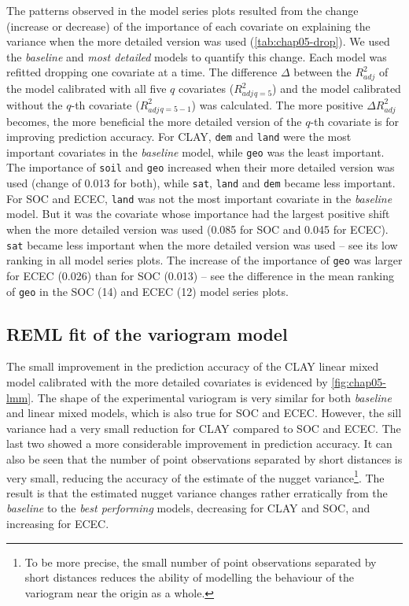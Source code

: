 The patterns observed in the model series plots resulted from the change (increase or decrease) of the 
importance of each covariate on explaining the variance when the more detailed version was used 
(\autoref{tab:chap05-drop}). We used the \emph{baseline} and \emph{most detailed} models to quantify this 
change. Each model was refitted dropping one covariate at a time. The difference $\Delta$ between the 
${R}^{2}_{adj}$ of the model calibrated with all five $q$ covariates (${R}^{2}_{adj}{}_{q = 5}$) and the model 
calibrated without the $q$-th covariate ($R^{2}_{adj}{}_{q = 5 - 1}$) was calculated. The more positive 
$\Delta{R}^{2}_{adj}$ becomes, the more beneficial the more detailed version of the $q$-th covariate is for 
improving prediction accuracy. For CLAY, \texttt{dem} and \texttt{land} were the most important covariates in 
the \emph{baseline} model, while \texttt{geo} was the least important. The importance of \texttt{soil} and 
\texttt{geo} increased when their more detailed version was used (change of \SI{+0.013}{\pp} for both), while 
\texttt{sat}, \texttt{land} and \texttt{dem} became less important. For SOC and ECEC, \texttt{land} was not the 
most important covariate in the \emph{baseline} model. But it was the covariate whose importance had the 
largest positive shift when the more detailed version was used (\SI{+0.085}{\pp} for SOC and \SI{+0.045}{\pp}
for ECEC). \texttt{sat} became less important when the more detailed version was used -- see its low ranking in 
all model series plots. The increase of the importance of \texttt{geo} was larger for ECEC (\SI{+0.026}{\pp}) 
than for SOC (\SI{+0.013}{\pp}) -- see the difference in the mean ranking of \texttt{geo} in the SOC 
(\num{14}) and ECEC (\num{12}) model series plots.



\subsection{REML fit of the variogram model}

\def\footnugget{To be more precise, the small number of point observations separated by short distances reduces 
the ability of modelling the behaviour of the variogram near the origin as a whole.}

The small improvement in the prediction accuracy of the CLAY linear mixed model calibrated with the more 
detailed covariates is evidenced by \autoref{fig:chap05-lmm}. The shape of the experimental variogram is very 
similar for both \emph{baseline} and  linear mixed models, which is also true for SOC 
and ECEC. However, the sill variance had a very small reduction for CLAY compared to SOC and ECEC. The last two 
showed a more considerable improvement in prediction accuracy. It can also be seen that the number of point 
observations separated by short distances is very small, reducing the accuracy of the estimate of the nugget 
variance\footnote{\footnugget}. The result is that the estimated nugget variance changes rather erratically 
from the \emph{baseline} to the \emph{best performing} models, decreasing for CLAY and SOC, and increasing 
for ECEC.

